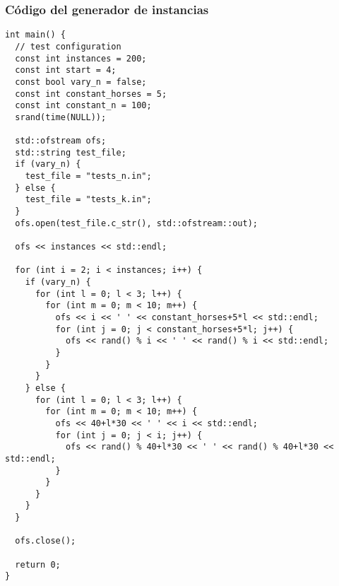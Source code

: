 \subsubsection{Código del generador de instancias}
\begin{lstlisting}[frame=single]
int main() {
  // test configuration
  const int instances = 200;
  const int start = 4;
  const bool vary_n = false;
  const int constant_horses = 5;
  const int constant_n = 100;
  srand(time(NULL));

  std::ofstream ofs;
  std::string test_file;
  if (vary_n) {
    test_file = "tests_n.in";
  } else {
    test_file = "tests_k.in";
  }
  ofs.open(test_file.c_str(), std::ofstream::out);

  ofs << instances << std::endl;

  for (int i = 2; i < instances; i++) {
    if (vary_n) {
      for (int l = 0; l < 3; l++) {
        for (int m = 0; m < 10; m++) {
          ofs << i << ' ' << constant_horses+5*l << std::endl;
          for (int j = 0; j < constant_horses+5*l; j++) {
            ofs << rand() % i << ' ' << rand() % i << std::endl;
          }
        }
      }
    } else {
      for (int l = 0; l < 3; l++) {
        for (int m = 0; m < 10; m++) {
          ofs << 40+l*30 << ' ' << i << std::endl;
          for (int j = 0; j < i; j++) {
            ofs << rand() % 40+l*30 << ' ' << rand() % 40+l*30 << std::endl;
          }
        }
      }
    }
  }

  ofs.close();

  return 0;
}
\end{lstlisting}

